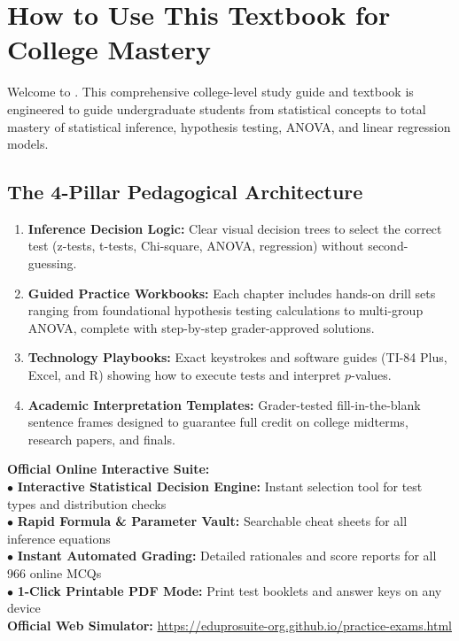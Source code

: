\tableofcontents
\clearpage

\chapter*{How to Use This Textbook for College Mastery}

Welcome to \textbf{\BookTitle}. This comprehensive college-level study guide and textbook is engineered to guide undergraduate students from statistical concepts to total mastery of statistical inference, hypothesis testing, ANOVA, and linear regression models.

\section*{The 4-Pillar Pedagogical Architecture}
\begin{enumerate}[leftmargin=1.5em]
  \item \textbf{Inference Decision Logic:} Clear visual decision trees to select the correct test (z-tests, t-tests, Chi-square, ANOVA, regression) without second-guessing.
  \item \textbf{Guided Practice Workbooks:} Each chapter includes hands-on drill sets ranging from foundational hypothesis testing calculations to multi-group ANOVA, complete with step-by-step grader-approved solutions.
  \item \textbf{Technology Playbooks:} Exact keystrokes and software guides (TI-84 Plus, Excel, and R) showing how to execute tests and interpret $p$-values.
  \item \textbf{Academic Interpretation Templates:} Grader-tested fill-in-the-blank sentence frames designed to guarantee full credit on college midterms, research papers, and finals.
\end{enumerate}

\begin{center}
\begin{tcolorbox}[standard jigsaw,width=0.95\linewidth,colback=NavyBlue!5!white,colframe=NavyBlue,title=\textbf{FREE DIGITAL WEB COMPANION \& PRACTICE PORTAL}]
\begin{minipage}{0.95\linewidth}
  \textbf{Official Online Interactive Suite:}\\
  $\bullet$ \textbf{Interactive Statistical Decision Engine:} Instant selection tool for test types and distribution checks\\
  $\bullet$ \textbf{Rapid Formula \& Parameter Vault:} Searchable cheat sheets for all inference equations\\
  $\bullet$ \textbf{Instant Automated Grading:} Detailed rationales and score reports for all 966 online MCQs\\
  $\bullet$ \textbf{1-Click Printable PDF Mode:} Print test booklets and answer keys on any device\\[6pt]
  \textbf{Official Web Simulator:} \url{https://eduprosuite-org.github.io/practice-exams.html}
\end{minipage}
\end{tcolorbox}
\end{center}

